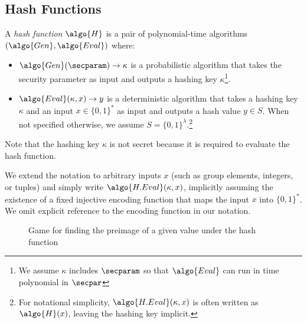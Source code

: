 \subsection{Hash Functions}

\begin{definition}
  A \emph{hash function} $\algo{H}$ is a pair of polynomial-time algorithms $(\algo{Gen}, \algo{Eval})$ where:
  \begin{itemize}
  \item $\algo{Gen}(\secparam) \rightarrow \kappa$ is a probabilistic algorithm that takes the security parameter as input and outputs a hashing key $\kappa$\footnote{We assume $\kappa$ includes $\secparam$ so that $\algo{Eval}$ can run in time polynomial in $\secpar$}.
  \item $\algo{Eval}(\kappa, x) \rightarrow y$ is a deterministic algorithm that takes a hashing key $\kappa$ and an input $x \in \{0,1\}^*$ as input and outputs a hash value $y \in S$. When not specified otherwise, we assume $S = \{0,1\}^{\lambda}$.\footnote{For notational simplicity, $\algo{H.Eval}(\kappa, x)$ is often written as $\algo{H}(x)$, leaving the hashing key implicit.}
  \end{itemize}
\end{definition}

Note that the hashing key $\kappa$ is not secret because it is required to evaluate the hash function.

\begin{remark}
  We extend the notation to arbitrary inputs $x$ (such as group elements, integers, or tuples) and simply write $\algo{H.Eval}(\kappa, x)$, implicitly assuming the existence of a fixed injective encoding function that maps the input $x$ into $\{0,1\}^*$.
  We omit explicit reference to the encoding function in our notation.
\end{remark}

\begin{figure}[tbhp]
  \begin{center}
    \begin{tcolorbox}[width=5cm]
      \begin{pchstack}[center]
      \end{pchstack}
    \end{tcolorbox}
  \end{center}
  \caption{Game for finding the preimage of a given value under the hash function \label{fig:break-hash}}
\end{figure}

